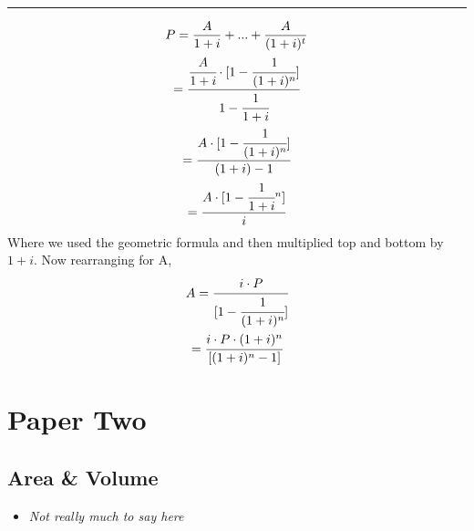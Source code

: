 \documentclass[10pt,a4paper]{article}
\begin{document}
\begin{itemize}
        \rule{\linewidth}{0.1mm}
        \begin{gather}
            P=\frac{A}{1+i}+...+\frac{A}{(1+i)^t} \\
            =\cfrac{\cfrac{A}{1+i}\cdot[1-\cfrac{1}{(1+i)^n}]}{1-\cfrac{1}{1+i}}\\
            = \cfrac{A\cdot[1-\cfrac{1}{(1+i)^n}]}{(1+i)-1} \\
            = \cfrac{A\cdot[1-\cfrac{1}{1+i}^n]}{i} 
        \end{gather}
        Where we used the geometric formula and then multiplied top and bottom by $1+i$. Now rearranging for A,
        \begin{gather}
            A = \cfrac{i \cdot P}{[1-\cfrac{1}{(1+i)^n}]}\\
            = \cfrac{i \cdot P \cdot (1+i)^n}{[(1+i)^n-1]}
        \end{gather} 
    \end{itemize}



\section{Paper Two}
\subsection{Area \& Volume}
    \begin{itemize}
        \item \textit{Not really much to say here}
    \end{itemize}
\end{document}
